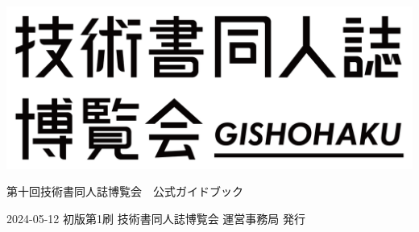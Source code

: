 \clearpage{\thispagestyle{empty}}
\begin{center}

\includegraphics[width=0.75\linewidth]{images/chap-title/logo.png}
\vspace{80pt}

\begin{sffamily}
\Large
第十回技術書同人誌博覧会　公式ガイドブック
\normalsize
\end{sffamily}
\vspace{320pt}

\begin{sffamily}
2024-05-12
\hspace{5pt}
初版第1刷
\hspace{5pt}
技術書同人誌博覧会 運営事務局
\hspace{5pt}
発行
\end{sffamily}

\end{center}
